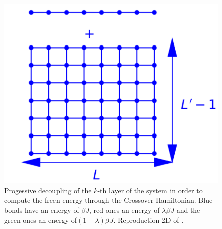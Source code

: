 \begin{figure}
\begin{minipage}[t]{0.32\linewidth}
\includegraphics[width=\linewidth]{numerical/cross-h1.pdf}
\caption*{$H_1$}
\end{minipage}
\caption{Progessive decoupling of the $k$-th layer of the system in order to compute the freen energy through the Crossover Hamiltonian. Blue bonds have an energy of $\beta J$, red ones an energy of $\lambda \beta J $ and the green ones an energy of$ (1-\lambda) \beta J$. Reproduction 2D of \cite{ vasilyev_universal_2009}.}
\label{decouplage}
\end{figure}


